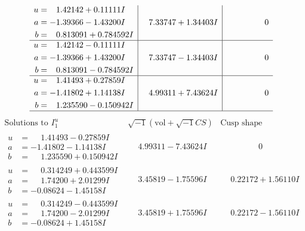 \documentclass[1p]{elsarticle_modified}
\theoremstyle{definition}
\newcommand{\I}{\sqrt{-1}}
\begin{document}
$$\begin{array}{c|c|c}
\begin{aligned}
u &= \phantom{-}1.42142 + 0.11111 I \\
a &= -1.39366 - 1.43200 I \\
b &= \phantom{-}0.813091 + 0.784592 I\end{aligned}
 & \phantom{-}7.33747 + 1.34403 I & \phantom{-0.000000 } 0 \\ \hline\begin{aligned}
u &= \phantom{-}1.42142 - 0.11111 I \\
a &= -1.39366 + 1.43200 I \\
b &= \phantom{-}0.813091 - 0.784592 I\end{aligned}
 & \phantom{-}7.33747 - 1.34403 I & \phantom{-0.000000 } 0 \\ \hline\begin{aligned}
u &= \phantom{-}1.41493 + 0.27859 I \\
a &= -1.41802 + 1.14138 I \\
b &= \phantom{-}1.235590 - 0.150942 I\end{aligned}
 & \phantom{-}4.99311 + 7.43624 I & \phantom{-0.000000 } 0\\
 \hline 
 \end{array}$$\newpage$$\begin{array}{c|c|c}  
\text{Solutions to }I^u_{1}& \I (\text{vol} + \sqrt{-1}CS) & \text{Cusp shape}\\
 \hline 
\begin{aligned}
u &= \phantom{-}1.41493 - 0.27859 I \\
a &= -1.41802 - 1.14138 I \\
b &= \phantom{-}1.235590 + 0.150942 I\end{aligned}
 & \phantom{-}4.99311 - 7.43624 I & \phantom{-0.000000 } 0 \\ \hline\begin{aligned}
u &= \phantom{-}0.314249 + 0.443599 I \\
a &= \phantom{-}1.74200 + 2.01299 I \\
b &= -0.08624 - 1.45158 I\end{aligned}
 & \phantom{-}3.45819 - 1.75596 I & \phantom{-}0.22172 + 1.56110 I \\ \hline\begin{aligned}
u &= \phantom{-}0.314249 - 0.443599 I \\
a &= \phantom{-}1.74200 - 2.01299 I \\
b &= -0.08624 + 1.45158 I\end{aligned}
 & \phantom{-}3.45819 + 1.75596 I & \phantom{-}0.22172 - 1.56110 I \\ \hline\begin{aligned}

\end{aligned}
\end{array}$$
\end{document}
